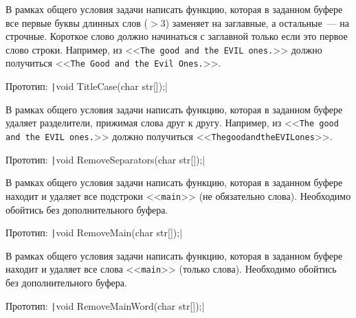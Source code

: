 
\begin{zztask}[Заголовок]
В рамках общего условия задачи написать функцию, которая в заданном буфере
все первые буквы длинных слов ($>3$) заменяет на заглавные, а остальные~--- на
строчные. Короткое слово должно начинаться с заглавной только если это первое
слово строки.
Например, из
<<\texttt{The good and the EVIL ones.}>>
должно получиться
<<\texttt{The Good and the Evil Ones.}>>.

Прототип: \texttt|void TitleCase(char str[]);|
\end{zztask}


\begin{zztask}
В рамках общего условия задачи написать функцию, которая в заданном буфере
удаляет разделители, прижимая слова друг к другу.
Например, из
<<\texttt{The good and the EVIL ones.}>>
должно получиться\linebreak
<<\texttt{ThegoodandtheEVILones}>>.

Прототип: \texttt|void RemoveSeparators(char str[]);|
\end{zztask}


\begin{zztask}
В рамках общего условия задачи написать функцию, которая в заданном буфере
находит и удаляет все подстроки <<\texttt{main}>> (не обязательно слова).
Необходимо обойтись без дополнительного буфера.

Прототип: \texttt|void RemoveMain(char str[]);|
\end{zztask}


\begin{zztask}
В рамках общего условия задачи написать функцию, которая в заданном буфере
находит и удаляет все слова <<\texttt{main}>> (только слова).
Необходимо обойтись без дополнительного буфера.

Прототип: \texttt|void RemoveMainWord(char str[]);|
\end{zztask}


